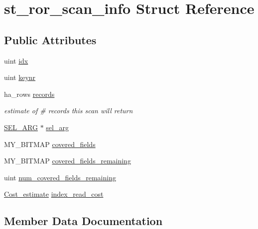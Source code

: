\hypertarget{structst__ror__scan__info}{}\section{st\+\_\+ror\+\_\+scan\+\_\+info Struct Reference}
\label{structst__ror__scan__info}
\subsection*{Public Attributes}
\begin{DoxyCompactItemize}
\item 
uint \mbox{\hyperlink{structst__ror__scan__info_a082aca5ab0d3432c6c483ed0f509cf4f}{idx}}
\item 
uint \mbox{\hyperlink{structst__ror__scan__info_aded55ddf642ef493675ccc853a992a35}{keynr}}
\item 
\mbox{\label{structst__ror__scan__info_a7659c11372ef391c4c0d69b978f5ac89}} 
ha\+\_\+rows \mbox{\hyperlink{structst__ror__scan__info_a7659c11372ef391c4c0d69b978f5ac89}{records}}
\begin{DoxyCompactList}\small\item\em estimate of \# records this scan will return \end{DoxyCompactList}\item 
\mbox{\hyperlink{classSEL__ARG}{S\+E\+L\+\_\+\+A\+RG}} $\ast$ \mbox{\hyperlink{structst__ror__scan__info_a6b4aeff7114b0fe4b2d5b46650739e73}{sel\+\_\+arg}}
\item 
M\+Y\+\_\+\+B\+I\+T\+M\+AP \mbox{\hyperlink{structst__ror__scan__info_a2946fad6e1c3c248b37e5b7b229c8ca5}{covered\+\_\+fields}}
\item 
M\+Y\+\_\+\+B\+I\+T\+M\+AP \mbox{\hyperlink{structst__ror__scan__info_acd669f67e7ae44baa98c290368b34861}{covered\+\_\+fields\+\_\+remaining}}
\item 
uint \mbox{\hyperlink{structst__ror__scan__info_acd196115ae72ced6f44c7b92b4eb318f}{num\+\_\+covered\+\_\+fields\+\_\+remaining}}
\item 
\mbox{\hyperlink{classCost__estimate}{Cost\+\_\+estimate}} \mbox{\hyperlink{structst__ror__scan__info_af02043284a79654c31bfd9ecd23f7375}{index\+\_\+read\+\_\+cost}}
\end{DoxyCompactItemize}


\subsection{Member Data Documentation}
\mbox{\label{structst__ror__scan__info_a2946fad6e1c3c248b37e5b7b229c8ca5}} 
